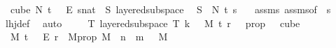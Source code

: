 \begin{isabellebody}
\ \ {\isacharparenleft}{\kern0pt}cube\ N\ {\isacharparenleft}{\kern0pt}t\ {\isacharplus}{\kern0pt}\ {}{\isacharparenright}{\kern0pt}{\isacharparenright}{\kern0pt}\ {\isasymrightarrow}\isactrlsub E\ {\isacharbraceleft}{\kern0pt}{\isachardot}{\kern0pt}{\isachardot}{\kern0pt}{\isacharless}{\kern0pt}s{\isacharcolon}{\kern0pt}{\isacharcolon}{\kern0pt}nat{\isacharbraceright}{\kern0pt}\ {\isasymlongrightarrow}\ {\isacharparenleft}{\kern0pt}{\isasymexists}S{\isachardot}{\kern0pt}\ layered{\isacharunderscore}{\kern0pt}subspace\isanewline
\ \ S\ {}\ N\ t\ s\ {\isasymchi}{\isacharparenright}{\kern0pt}{\isacharparenright}{\kern0pt}{\isacharparenright}{\kern0pt}{\isachardoublequoteclose}\ \isamarkupfalse%
\ assms{\isacharparenleft}{\kern0pt}{}{\isacharparenright}{\kern0pt}\ assms{\isacharparenleft}{\kern0pt}{}{\isacharparenright}{\kern0pt}{\isacharbrackleft}{\kern0pt}of\ {\isachardoublequoteopen}{}{\isachardoublequoteclose}\ {\isachardoublequoteopen}s{\isachardoublequoteclose}{\isacharbrackright}{\kern0pt}\ \isamarkupfalse%
\ lhj{\isacharunderscore}{\kern0pt}def\ \isamarkupfalse%
\ auto\ \isanewline
\isanewline
\ \ \isamarkupfalse%
\ {\isachardoublequoteopen}{\isacharparenleft}{\kern0pt}{\isasymexists}T{\isachardot}{\kern0pt}\ layered{\isacharunderscore}{\kern0pt}subspace\ T\ {\isacharparenleft}{\kern0pt}k\ {\isacharplus}{\kern0pt}\ {}{\isacharparenright}{\kern0pt}\ {\isacharparenleft}{\kern0pt}M{\isacharprime}{\kern0pt}{\isacharparenright}{\kern0pt}\ t\ r\ {\isasymchi}{\isacharparenright}{\kern0pt}{\isachardoublequoteclose}\ \ {\isasymchi}{\isacharunderscore}{\kern0pt}prop{\isacharcolon}{\kern0pt}\ {\isachardoublequoteopen}{\isasymchi}\ {\isasymin}\ cube\isanewline
\ \ M{\isacharprime}{\kern0pt}\ {\isacharparenleft}{\kern0pt}t\ {\isacharplus}{\kern0pt}\ {}{\isacharparenright}{\kern0pt}\ {\isasymrightarrow}\isactrlsub E\ {\isacharbraceleft}{\kern0pt}{\isachardot}{\kern0pt}{\isachardot}{\kern0pt}{\isacharless}{\kern0pt}r{\isacharbraceright}{\kern0pt}{\isachardoublequoteclose}\ \ M{\isacharprime}{\kern0pt}{\isacharunderscore}{\kern0pt}prop{\isacharcolon}{\kern0pt}\ {\isachardoublequoteopen}M{\isacharprime}{\kern0pt}\ {\isasymge}\ n{\isacharprime}{\kern0pt}\ {\isacharplus}{\kern0pt}\ m{\isachardoublequoteclose}\ \ {\isasymchi}\ M{\isacharprime}{\kern0pt}\isanewline
\ \ \isamarkupfalse%
\ {\isacharminus}{\kern0pt}\isanewline
\ \ \ \ \isamarkupfalse%

\end{isabellebody}
